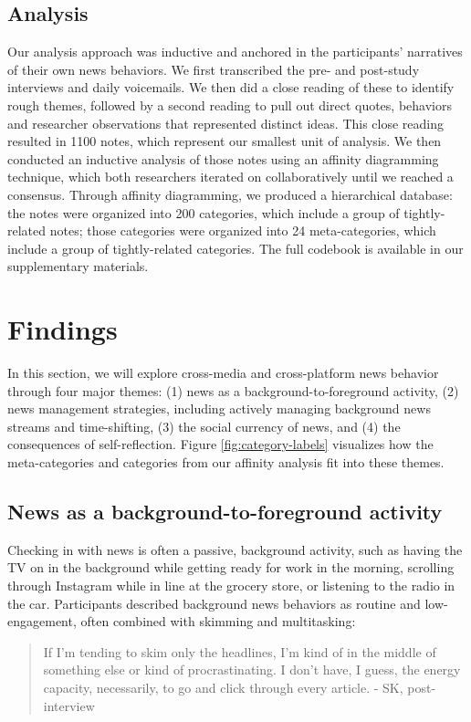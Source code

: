 \documentclass[sigchi]{acmart}
\begin{document}
\subsection{Analysis}
Our analysis approach was inductive and anchored in the participants’ narratives of their own news behaviors. We first transcribed the pre- and post-study interviews and daily voicemails. We then did a close reading of these to identify rough themes, followed by a second reading to pull out direct quotes, behaviors and researcher observations that represented distinct ideas. This close reading resulted in 1100 notes, which represent our smallest unit of analysis. We then conducted an inductive analysis of those notes using an affinity diagramming technique, which both researchers iterated on collaboratively until we reached a consensus. Through affinity diagramming, we produced a hierarchical database: the notes were organized into 200 categories, which include a group of tightly-related notes; those categories were organized into 24 meta-categories, which include a group of tightly-related categories. The full codebook is available in our supplementary materials.

\section{Findings}
In this section, we will explore cross-media and cross-platform news behavior through four major themes: (1) news as a background-to-foreground activity, (2) news management strategies, including actively managing background news streams and time-shifting, (3) the social currency of news, and (4) the consequences of self-reflection. Figure \ref{fig:category-labels} visualizes how the meta-categories and categories from our affinity analysis fit into these themes.

\subsection{News as a background-to-foreground activity}
Checking in with news is often a passive, background activity, such as having the TV on in the background while getting ready for work in the morning, scrolling through Instagram while in line at the grocery store, or listening to the radio in the car. Participants described background news behaviors as routine and low-engagement, often combined with skimming and multitasking: 

\begin{quote}
    If I’m tending to skim only the headlines, I’m kind of in the middle of something else or kind of procrastinating. I don’t have, I guess, the energy capacity, necessarily, to go and click through every article. - SK, post-interview
\end{quote}
\end{document}
